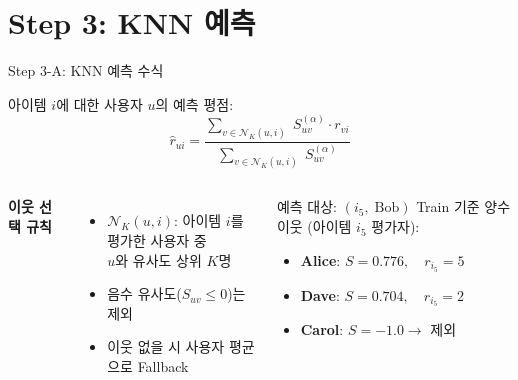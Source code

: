 \documentclass[aspectratio=169, 10pt]{beamer}
\begin{document}
\section{Step 3: KNN 예측}

\begin{frame}{Step 3-A: KNN 예측 수식}

  아이템 $i$에 대한 사용자 $u$의 예측 평점:
  \begin{equation*}
    \hat{r}_{ui} =
    \frac{\displaystyle\sum_{v \in \mathcal{N}_K(u,i)}\; S_{uv}^{(\alpha)} \cdot r_{vi}}
         {\displaystyle\sum_{v \in \mathcal{N}_K(u,i)}\; S_{uv}^{(\alpha)}}
  \end{equation*}

  \vspace{0.3em}
  \begin{columns}[T]
      \textbf{이웃 선택 규칙}
      \begin{itemize}
        \item $\mathcal{N}_K(u,i)$: 아이템 $i$를 평가한 사용자 중\\
              $u$와 유사도 상위 $K$명
        \item 음수 유사도($S_{uv} \le 0$)는 제외
        \item 이웃 없을 시 사용자 평균으로 Fallback
      \end{itemize}

      \begin{block}{예측 대상: $(i_5,\;\text{Bob})$}
        Train 기준 양수 이웃 (아이템 $i_5$ 평가자):
        \begin{itemize}
          \item \textbf{Alice}: $S = 0.776,\quad r_{i_5} = 5$
          \item \textbf{Dave}: $S = 0.704,\quad r_{i_5} = 2$
          \item \textbf{Carol}: $S = -1.0 \to$ 제외
        \end{itemize}
      \end{block}
  \end{columns}
\end{frame}
\end{document}
